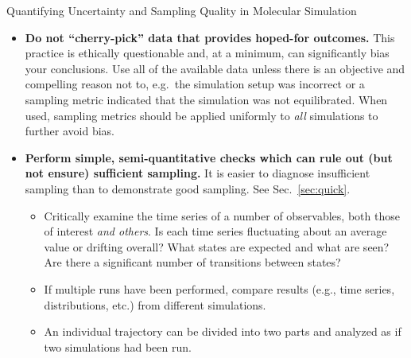 \begin{Checklists*}[p!]
\begin{checklist}{Quantifying Uncertainty and Sampling Quality in Molecular Simulation}
\begin{itemize}
\item
  \textbf{Do not ``cherry-pick'' data that provides hoped-for outcomes.}
  This practice is ethically questionable and, at a minimum, can significantly bias your conclusions.
  Use all of the available data unless there is an objective and compelling reason not to, e.g.\ the simulation setup was incorrect or a sampling metric indicated that the simulation was not equilibrated.
  When used, sampling metrics should be applied uniformly to \emph{all} simulations to further avoid bias.
    
\item
\textbf{Perform simple, semi-quantitative checks which can rule out (but not ensure) sufficient sampling.} It is easier to diagnose insufficient sampling than to demonstrate good sampling.  See Sec.\ \ref{sec:quick}.
    \begin{itemize}
    \item Critically examine the time series of a number of observables, both those of interest \emph{and others}.
      Is each time series fluctuating about an average value or drifting overall?
      What states are expected and what are seen?
      Are there a significant number of transitions between states?
    \item If multiple runs have been performed, compare results (e.g., time series, distributions, etc.) from different simulations.
    \item An individual trajectory can be divided into two parts and analyzed as if two simulations had been run.
    \end{itemize}
        \vspace{-0.325\baselineskip} %


\end{itemize}
\end{checklist}
\end{Checklists*}
